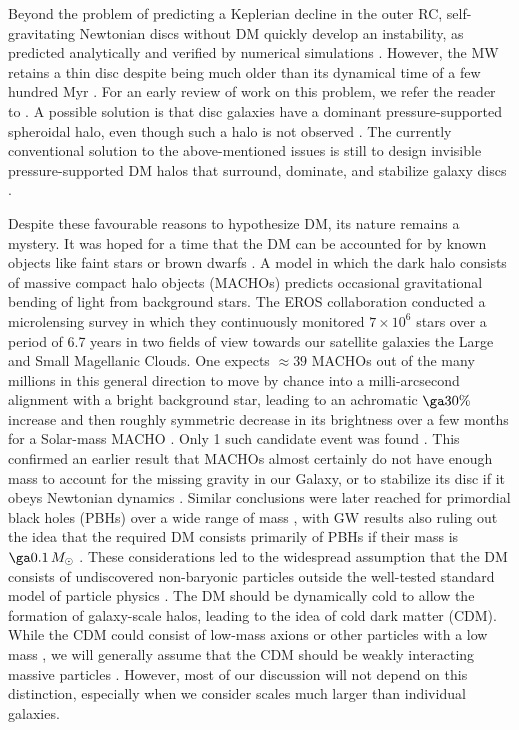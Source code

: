 \documentclass[fleqn,usenatbib,useAMS,onecolumn]{mnras} %
\begin{document}
Beyond the problem of predicting a Keplerian decline in the outer RC, self-gravitating Newtonian discs without DM quickly develop an instability, as predicted analytically \citep{Toomre_1964} and verified by numerical simulations \citep{Hohl_1971}. However, the MW retains a thin disc despite being much older than its dynamical time of a few hundred Myr \citep*{Knox_1999}. For an early review of work on this problem, we refer the reader to \citet{Sellwood_1993}. A possible solution is that disc galaxies have a dominant pressure-supported spheroidal halo, even though such a halo is not observed \citep{Ostriker_Peebles_1973}. The currently conventional solution to the above-mentioned issues is still to design invisible pressure-supported DM halos that surround, dominate, and stabilize galaxy discs \citep*{Ostriker_Peebles_Yahil_1974, White_Rees_78}.

Despite these favourable reasons to hypothesize DM, its nature remains a mystery. It was hoped for a time that the DM can be accounted for by known objects like faint stars or brown dwarfs \citep{Carr_1994}. A model in which the dark halo consists of massive compact halo objects (MACHOs) predicts occasional gravitational bending of light from background stars. The EROS collaboration \citep{Aubourg_1993} conducted a microlensing survey in which they continuously monitored $7 \times 10^6$ stars over a period of 6.7 years in two fields of view towards our satellite galaxies the Large and Small Magellanic Clouds. One expects $\approx 39$ MACHOs out of the many millions in this general direction to move by chance into a milli-arcsecond alignment with a bright background star, leading to an achromatic $\ga 30\%$ increase and then roughly symmetric decrease in its brightness over a few months for a Solar-mass MACHO \citep[the two images are by definition unresolved in microlensing;][]{Refsdal_1966, Paczynski_1986}. Only 1 such candidate event was found \citep{EROS_2007}. This confirmed an earlier result \citep{MACHO_2000} that MACHOs almost certainly do not have enough mass to account for the missing gravity in our Galaxy, or to stabilize its disc if it obeys Newtonian dynamics \citep[for a historical review of microlensing, we refer the reader to][]{Pietrzynski_2018}. Similar conclusions were later reached for primordial black holes (PBHs) over a wide range of mass \citep{Niikura_2019}, with GW results also ruling out the idea that the required DM consists primarily of PBHs if their mass is $\ga 0.1 \, M_\odot$ \citep{Wang_2018}. These considerations led to the widespread assumption that the DM consists of undiscovered non-baryonic particles outside the well-tested standard model of particle physics \citep[for a historical review of how this paradigm came about, see][]{Peebles_2017_DM_review}. The DM should be dynamically cold to allow the formation of galaxy-scale halos, leading to the idea of cold dark matter (CDM). While the CDM could consist of low-mass axions \citep{Sikivie_1983} or other particles with a low mass \citep{Hui_2017}, we will generally assume that the CDM should be weakly interacting massive particles \citep[WIMPs;][]{Kamionkowski_1998}. However, most of our discussion will not depend on this distinction, especially when we consider scales much larger than individual galaxies.
\end{document}
